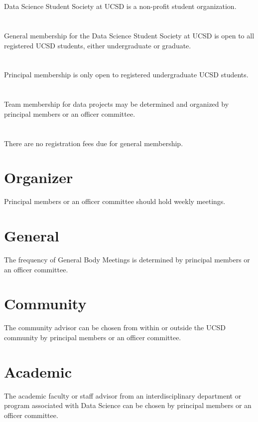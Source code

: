 \documentclass[12pt]{constitution}
\begin{document}
\section{} Data Science Student Society at UCSD is a non-profit student organization.

\section{} General membership for the Data Science Student Society at UCSD is open to all registered UCSD students, either undergraduate or graduate.
\section{} Principal membership is only open to registered undergraduate UCSD students.
\section{} Team membership for data projects may be determined and organized by principal members or an officer committee.
\section{} There are no registration fees due for general membership.

\section{Organizer}Principal members or an officer committee should hold weekly meetings.
\section{General}The frequency of General Body Meetings is determined by principal members or an officer committee.

\section{Community} The community advisor can be chosen from within or outside the UCSD community by principal members or an officer committee.
\section{Academic} The academic faculty or staff advisor from an interdisciplinary department or program associated with Data Science can be chosen by principal members or an officer committee.
\end{document}
